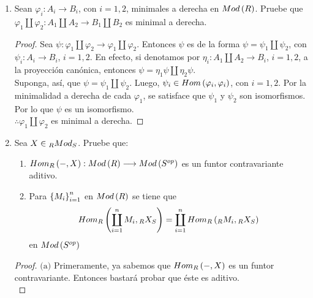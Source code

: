 \documentclass{article}
\begin{document}
\begin{enumerate}[label=\textbf{Ej \arabic*.}]
\begin{proof}
		$\boxed{\text{b)}\Rightarrow\text{a)}}$ Por hipótesis, existe un morfismo de $R$-módulos $f_{2}:M_{2} \longrightarrow M$ tal que $g_{2}f_{2}=1_{M_{2}}$. Por tanto, $\eta$ es una sucesión que se parte.
	\end{proof}
	
	\item Sean $\varphi_{i}:A_{i} \longrightarrow B_{i}$, con $i=1,2$, minimales a derecha en $Mod\left(R\right)$. Pruebe que $\varphi_{1}\coprod\varphi_{2}:A_{1} \coprod A_{2} \longrightarrow B_{1} \coprod B_{2}$ es minimal a derecha.
	\begin{proof}
		Sea $\psi:\varphi_{1}\coprod\varphi_{2}\longrightarrow\varphi_{1}\coprod\varphi_{2}$. Entonces $\psi$ es de la forma $\psi = \psi_{1}\coprod\psi_{2}$, con $\psi_{i}:A_{i} \longrightarrow B_{i}$, $i=1,2$. En efecto, si denotamos por $\eta_{i}:A_{1} \coprod A_{2} \longrightarrow B_{i}$, $i=1,2$, a la proyección canónica, entonces $\psi = \eta_{1}\psi\coprod\eta_{2}\psi$.\\
		
		Suponga, así, que $\psi = \psi_{1}\coprod\psi_{2}$. Luego, $\psi_{i} \in Hom\left(\varphi_{i},\varphi_{i}\right)$, con $i=1,2$. Por la minimalidad a derecha de cada $\varphi_{1}$, se satisface que $\psi_{1}$ y $\psi_{2}$ son isomorfismos. Por lo que $\psi$ es un isomorfismo.\\
		$\therefore\varphi_{1}\coprod\varphi_{2}$ es minimal a derecha.
	\end{proof}
	
	\item Sea $X\in\ringbimod{R}{S}{Mod}{lr}$. Pruebe que:
	\begin{enumerate}
		\item $Hom_{R}\left(-,X\right): Mod\left(R\right) \longrightarrow Mod\left({S}^{op}\right)$ es un funtor contravariante aditivo.
		\item Para ${\left\{{M}_{i}\right\}}_{i=1}^{n}$ en $Mod\left(R\right)$ se tiene que
		\begin{align*}
			\ringmodhom{R}{\displaystyle\coprod_{i=1}^{n}M_{i}}{\ringbimod{R}{S}{X}{lr}}=\displaystyle\coprod_{i=1}^{n}\ringmodhom{R}{\ringmod{R}{M_{i}}{l}}{\ringbimod{R}{S}{X}{lr}}
		\end{align*}
		en $Mod\left({S}^{op}\right)$
	\end{enumerate}
	\begin{proof}
		$\boxed{\text{(a)}}$ Primeramente, ya sabemos que $Hom_{R}\left(-,X\right)$ es un funtor contravariante. Entonces bastará probar que éste es aditivo.\\
		

\end{proof}
\end{enumerate}
\end{document}
